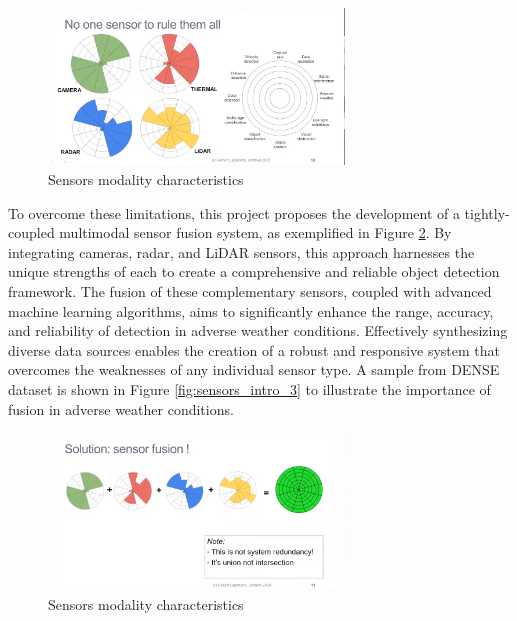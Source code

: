 \documentclass[report.tex]{subfiles}
\begin{document}
        \begin{figure}[h]
            \centering
            \includegraphics[width=0.7\textwidth]{images/sensors_intro_1.png}
            \caption{Sensors modality characteristics \cite{Sensor_modality_characteristics_1}}
            \label{fig:sensors_intro_1}
        \end{figure}

        To overcome these limitations, this project proposes the development of a tightly-coupled multimodal sensor fusion system, as exemplified in Figure \ref{fig:sensors_intro_2}. By integrating cameras, radar, and LiDAR sensors, this approach harnesses the unique strengths of each to create a comprehensive and reliable object detection framework. The fusion of these complementary sensors, coupled with advanced machine learning algorithms, aims to significantly enhance the range, accuracy, and reliability of detection in adverse weather conditions. Effectively synthesizing diverse data sources enables the creation of a robust and responsive system that overcomes the weaknesses of any individual sensor type. A sample from DENSE dataset \cite{bijelic2020seeing} is shown in Figure \ref{fig:sensors_intro_3} to illustrate the importance of fusion in adverse weather conditions.

        \begin{figure}[h]
            \centering
            \includegraphics[width=0.7\textwidth]{images/sensors_intro_2.png}
            \caption{Sensors modality characteristics \cite{Sensor_modality_characteristics_1}}
            \label{fig:sensors_intro_2}
        \end{figure}
\end{document}
